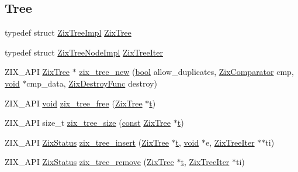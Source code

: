 \subsection*{Tree}
\begin{DoxyCompactItemize}
\item 
typedef struct \hyperlink{struct_zix_tree_impl}{Zix\+Tree\+Impl} \hyperlink{group__zix_ga684b19fdde4e1e069abd68304fa9518c}{Zix\+Tree}
\item 
typedef struct \hyperlink{struct_zix_tree_node_impl}{Zix\+Tree\+Node\+Impl} \hyperlink{group__zix_gad5034843cec6bf6ebbdc5b5fda7b112e}{Zix\+Tree\+Iter}
\item 
Z\+I\+X\+\_\+\+A\+PI \hyperlink{group__zix_ga684b19fdde4e1e069abd68304fa9518c}{Zix\+Tree} $\ast$ \hyperlink{group__zix_ga72db646eab3fe826b87f97e02cf3bbd5}{zix\+\_\+tree\+\_\+new} (\hyperlink{mac_2config_2i386_2lib-src_2libsoxr_2soxr-config_8h_abb452686968e48b67397da5f97445f5b}{bool} allow\+\_\+duplicates, \hyperlink{group__zix_gaa647997c2e16e85391dad2d77c02aff6}{Zix\+Comparator} cmp, \hyperlink{sound_8c_ae35f5844602719cf66324f4de2a658b3}{void} $\ast$cmp\+\_\+data, \hyperlink{group__zix_ga116fe3bb614b937a4190ab5fe645cc87}{Zix\+Destroy\+Func} destroy)
\item 
Z\+I\+X\+\_\+\+A\+PI \hyperlink{sound_8c_ae35f5844602719cf66324f4de2a658b3}{void} \hyperlink{group__zix_gaa7e4d26fc7a27fff154c77b3b617d21c}{zix\+\_\+tree\+\_\+free} (\hyperlink{group__zix_ga684b19fdde4e1e069abd68304fa9518c}{Zix\+Tree} $\ast$\hyperlink{octave__test_8m_aaccc9105df5383111407fd5b41255e23}{t})
\item 
Z\+I\+X\+\_\+\+A\+PI size\+\_\+t \hyperlink{group__zix_gab456b92143bf007912fa343a8fcb5e69}{zix\+\_\+tree\+\_\+size} (\hyperlink{getopt1_8c_a2c212835823e3c54a8ab6d95c652660e}{const} \hyperlink{group__zix_ga684b19fdde4e1e069abd68304fa9518c}{Zix\+Tree} $\ast$\hyperlink{octave__test_8m_aaccc9105df5383111407fd5b41255e23}{t})
\item 
Z\+I\+X\+\_\+\+A\+PI \hyperlink{group__zix_ga8ff29bfb81c64f449534790cac128b19}{Zix\+Status} \hyperlink{group__zix_gabbf32f6bf3dd802fd36af7ac17cee87c}{zix\+\_\+tree\+\_\+insert} (\hyperlink{group__zix_ga684b19fdde4e1e069abd68304fa9518c}{Zix\+Tree} $\ast$\hyperlink{octave__test_8m_aaccc9105df5383111407fd5b41255e23}{t}, \hyperlink{sound_8c_ae35f5844602719cf66324f4de2a658b3}{void} $\ast$e, \hyperlink{group__zix_gad5034843cec6bf6ebbdc5b5fda7b112e}{Zix\+Tree\+Iter} $\ast$$\ast$ti)
\item 
Z\+I\+X\+\_\+\+A\+PI \hyperlink{group__zix_ga8ff29bfb81c64f449534790cac128b19}{Zix\+Status} \hyperlink{group__zix_ga85f6980a8c620410a2e96e1926ed2411}{zix\+\_\+tree\+\_\+remove} (\hyperlink{group__zix_ga684b19fdde4e1e069abd68304fa9518c}{Zix\+Tree} $\ast$\hyperlink{octave__test_8m_aaccc9105df5383111407fd5b41255e23}{t}, \hyperlink{group__zix_gad5034843cec6bf6ebbdc5b5fda7b112e}{Zix\+Tree\+Iter} $\ast$ti)
$$
\end{DoxyCompactItemize}
